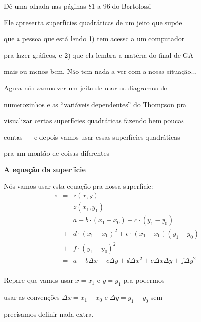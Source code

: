 \documentclass[oneside,12pt]{article}
\begin{document}
Dê uma olhada nas páginas 81 a 96 do Bortolossi ---

\msk

Ele apresenta superfícies quadráticas de um jeito que supõe

que a pessoa que está lendo 1) tem acesso a um computador

pra fazer gráficos, e 2) que ela lembra a matéria do final de GA

mais ou menos bem. Não tem nada a ver com a nossa situação...

\msk

Agora nós vamos ver um jeito de usar os diagramas de

numerozinhos e as ``variáveis dependentes'' do Thompson pra

visualizar certas superfícies quadráticas fazendo bem poucas

contas --- e depois vamos usar essas superfícies quadráticas

pra um montão de coisas diferentes.










\newpage


{\bf A equação da superfície}

Nós vamos usar esta equação pra nossa superfície:
%
$$\begin{array}{rcl}
  z &=& z(x,y) \\
    &=& z(x_1,y_1) \\
    &=& a + b·(x_1-x_0) + c·(y_1-y_0) \\
    &+& d·(x_1-x_0)^2 + e·(x_1-x_0)(y_1-y_0) \\
    &+& f·(y_1-y_0)^2 \\
    &=& a + bΔx + cΔy + dΔx^2 + eΔxΔy + fΔy^2 \\
  \end{array}
$$

Repare que vamos usar $x=x_1$ e $y=y_1$ pra podermos

usar as convenções $Δx=x_1-x_0$ e $Δy=y_1-y_0$ sem

precisamos definir nada extra.

\msk
\end{document}
